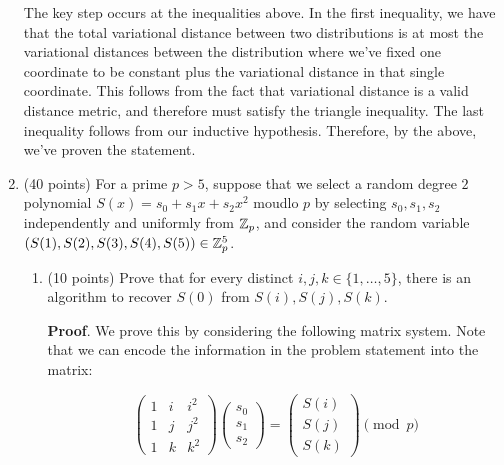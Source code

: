 \documentclass{article}
\begin{document}
\begin{enumerate}
The key step occurs at the inequalities above. In the first inequality, we have that the total 
variational distance between two distributions is at most the variational distances between 
the distribution where we've fixed one coordinate to be constant plus the variational distance
in that single coordinate. This follows from the fact that variational distance is a valid
distance metric, and therefore must satisfy the triangle inequality. The last inequality
follows from our inductive hypothesis. Therefore, by the above, we've proven the statement.
\mdfloatright{\ensuremath{\Box}}%

\item{}
(40 points) For a prime $p>5$, suppose that we select a random degree $2$ polynomial $S(x) = s_0 + s_1x+ s_2x^2$ moudlo $p$ by selecting $s_0,s_1,s_2$ independently and uniformly from $\mathbb{Z}_p$, and consider the random variable $(S(1),S(2),S(3),S(4),S(5)) \in \mathbb{Z}_p^5$.%

\begin{enumerate}[,label=\alph*.]%

\item{}
(10 points) Prove that for every distinct $i,j,k \in \{1,\ldots, 5 \}$, there is an algorithm to recover $S(0)$ from $S(i),S(j),S(k)$.%

\begin{mdbmarginx}{1ex}{0pt}{1ex}{0pt}%
\noindent{}\textbf{Proof}.  We prove this by considering the following matrix system. Note that we can encode the information
in the problem statement into the matrix:%
\end{mdbmarginx}%
\noindent\noindent\[%
\begin{pmatrix} 
1 & i & i^2 \\
1 & j & j^2 \\
1 & k & k^2 
\end{pmatrix}
\begin{pmatrix}
s_0 \\ s_1 \\ s_2
\end{pmatrix}
=
\begin{pmatrix}
S(i)\\S(j)\\ S(k)
\end{pmatrix} \pmod{p}
\]%


\end{enumerate}
\end{enumerate}
\end{document}
